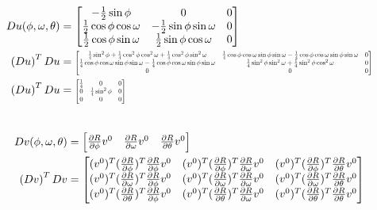 \documentclass[12pt]{article}
\newcommand*{\Scale}[2][4]{\scalebox{#1}{$#2$}}%
\begin{document}
\begin{align}
  Du(\phi, \omega, \theta) &= \begin{bmatrix} -\frac{1}{2}\sin\phi & 0 & 0 \\ \frac{1}{2}\cos\phi\cos\omega & -\frac{1}{2}\sin\phi\sin\omega & 0 \\  \frac{1}{2}\cos\phi\sin\omega & \frac{1}{2}\sin\phi\cos\omega & 0\end{bmatrix} \\
  \left(Du\right)^TDu &= \Scale[0.60]{\begin{bmatrix} 
\frac{1}{4}\sin^2\phi + \frac{1}{4}\cos^2\phi\cos^2\omega+ \frac{1}{4}\cos^2\phi\sin^2\omega
&  \frac{1}{4}\cos\phi\cos\omega\sin\phi\sin\omega - \frac{1}{4}\cos\phi\cos\omega\sin\phi\sin\omega 
& 0 
\\ \frac{1}{4}\cos\phi\cos\omega\sin\phi\sin\omega - \frac{1}{4}\cos\phi\cos\omega\sin\phi\sin\omega 
& \frac{1}{4}\sin^2\phi\sin^2\omega + \frac{1}{4}\sin^2\phi\cos^2\omega
& 0
\\ 0
& 0
& 0 \end{bmatrix}} \\
  \left(Du\right)^TDu &= \Scale[0.60]{\begin{bmatrix} 
\frac{1}{4}
& 0
& 0 
\\ 0 
& \frac{1}{4}\sin^2\phi
& 0
\\ 0
& 0
& 0 \end{bmatrix}}
\end{align} \\


\begin{align}
Dv(\phi, \omega, \theta) &= \Scale[1.0]{\begin{bmatrix}
\frac{\partial R}{\partial\phi}v^0 & \frac{\partial R}{\partial\omega}v^0 & \frac{\partial R}{\partial\theta}v^0 
\end{bmatrix}} \\
\left(Dv\right)^TDv &= \Scale[1.0]{\begin{bmatrix}
(v^0)^T(\frac{\partial R}{\partial\phi})^T\frac{\partial R}{\partial\phi}v^0 & (v^0)^T(\frac{\partial R}{\partial\phi})^T\frac{\partial R}{\partial\omega}v^0 & (v^0)^T(\frac{\partial R}{\partial\phi})^T\frac{\partial R}{\partial\theta}v^0 \\
(v^0)^T(\frac{\partial R}{\partial\omega})^T\frac{\partial R}{\partial\phi}v^0 & (v^0)^T(\frac{\partial R}{\partial\omega})^T\frac{\partial R}{\partial\omega}v^0 & (v^0)^T(\frac{\partial R}{\partial\omega})^T\frac{\partial R}{\partial\theta}v^0 \\ 
    (v^0)^T(\frac{\partial R}{\partial\theta})^T\frac{\partial R}{\partial\phi}v^0 & (v^0)^T(\frac{\partial R}{\partial\theta})^T\frac{\partial R}{\partial\omega}v^0 & (v^0)^T(\frac{\partial R}{\partial\theta})^T\frac{\partial R}{\partial\theta}v^0 
\end{bmatrix}}
\end{align}
\end{document}
